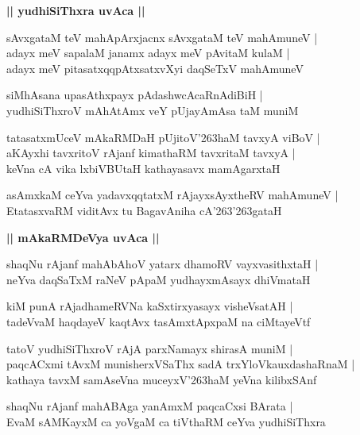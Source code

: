 \documentclass[twoside,12pt,openright]{book}
\def\S{\char'263}
\newcounter{shloka}[chapter]
\def\uvaca#1{\centerline{{\large\textbf{#1}}}}
\begin{document}
\uvaca{|| yudhiSiThxra uvAca ||}

\begin{shloka}
sAvxgataM teV mahApArxjacnx sAvxgataM teV mahAmuneV |\\
adayx meV sapalaM janamx adayx meV pAvitaM kulaM |\\
adayx meV pitasatxqqpAtxsatxvXyi daqSeTxV mahAmuneV 
\end{shloka}

\begin{shloka}
siMhAsana upasAthxpayx pAdashwcAcaRnAdiBiH |\\
yudhiSiThxroV mAhAtAmx veY pUjayAmAsa taM muniM 
\end{shloka}

\begin{shloka}
tatasatxmUceV mAkaRMDaH pUjitoV\S haM tavxyA viBoV |\\
aKAyxhi tavxritoV rAjanf kimathaRM tavxritaM tavxyA |\\
keVna cA vika lxbiVBUtaH kathayasavx mamAgarxtaH 
\end{shloka}

\begin{shloka}
asAmxkaM ceYva yadavxqqtatxM rAjayxsAyxtheRV mahAmuneV |\\
EtatasxvaRM viditAvx tu BagavAniha cA\S\S gataH 
\end{shloka}

\uvaca{|| mAkaRMDeVya uvAca ||}

\begin{shloka}
shaqNu rAjanf mahAbAhoV yatarx dhamoRV vayxvasithxtaH |\\
neYva daqSaTxM raNeV pApaM yudhayxmAsayx dhiVmataH 
\end{shloka}

\begin{shloka}
kiM punA rAjadhameRVNa kaSxtirxyasayx visheVsatAH |\\
tadeVvaM haqdayeV kaqtAvx tasAmxtApxpaM na ciMtayeVtf 
\end{shloka}

\begin{shloka}
tatoV yudhiSiThxroV rAjA parxNamayx shirasA muniM |\\
paqcACxmi tAvxM munisherxVSaThx sadA trxYloVkauxdashaRnaM |\\
kathaya tavxM samAseVna muceyxV\S haM yeVna kilibxSAnf
\end{shloka}

\begin{shloka}
shaqNu rAjanf mahABAga yanAmxM paqcaCxsi BArata |\\
EvaM sAMKayxM ca yoVgaM ca tiVthaRM ceYva yudhiSiThxra
\end{shloka}
\end{document}
